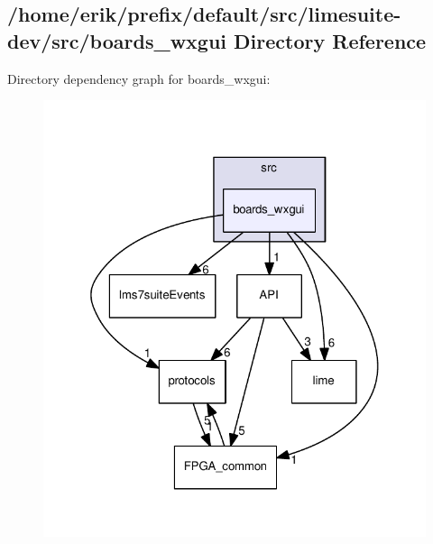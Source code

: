 \subsection{/home/erik/prefix/default/src/limesuite-\/dev/src/boards\+\_\+wxgui Directory Reference}
\label{dir_82b7fc53ca22aa48e4752077e118194f}
Directory dependency graph for boards\+\_\+wxgui\+:
\nopagebreak
\begin{figure}[H]
\begin{center}
\leavevmode
\includegraphics[width=322pt]{dir_82b7fc53ca22aa48e4752077e118194f_dep}
\end{center}
\end{figure}
